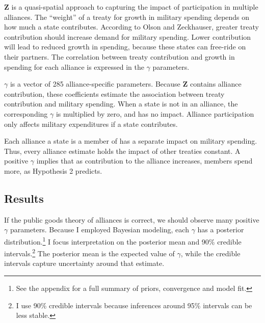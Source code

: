 \documentclass[12pt]{article}
\begin{document}
\textbf{Z} is a quasi-spatial approach to capturing the impact of participation in multiple alliances.
The ``weight'' of a treaty for growth in military spending depends on how much a state contributes.  
According to Olson and Zeckhauser, greater treaty contribution should increase demand for military spending. 
Lower contribution will lead to reduced growth in spending, because these states can free-ride on their partners.
The correlation between treaty contribution and growth in spending for each alliance is expressed in the $\gamma$ parameters. 


$\gamma$ is a vector of 285 alliance-specific parameters.  
Because \textbf{Z} contains alliance contribution, these coefficients estimate the association between treaty contribution and military spending. 
When a state is not in an alliance, the corresponding $\gamma$ is multiplied by zero, and has no impact. 
Alliance participation only affects military expenditures if a state contributes. 


Each alliance a state is a member of has a separate impact on military spending.
Thus, every alliance estimate holds the impact of other treaties constant. 
A positive $\gamma$ implies that as contribution to the alliance increases, members spend more, as Hypothesis 2 predicts. 
    


\subsection{Results} 


If the public goods theory of alliances is correct, we should observe many positive $\gamma$ parameters. 
Because I employed Bayesian modeling, each $\gamma$ has a posterior distribution.\footnote{See the appendix for a full summary of priors, convergence and model fit.} 
I focus interpretation on the posterior mean and 90\% credible intervals.\footnote{I use 90\% credible intervals because inferences around 95\% intervals can be less stable.}
The posterior mean is the expected value of $\gamma$, while the credible intervals capture uncertainty around that estimate.  
\end{document}
